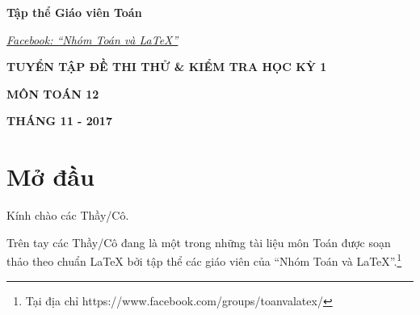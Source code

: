 \documentclass[12pt,a4paper,oneside]{book}
\renewcommand{\baselinestretch}{1.4}
\begin{document}
	\begin{titlepage}
		\begin{tcolorbox}[width=.99\textwidth,height=.99\textheight]
			\begin{flushright}
				\fontsize{17}{0}\selectfont
				\textbf{Tập thể Giáo viên Toán}
				
				\hyperlink{https://www.facebook.com/groups/toanvalatex/}{\textit{Facebook: ``Nhóm Toán và LaTeX''}}
			\end{flushright}
			
			\vspace{4cm}
			
			\begin{flushright}
				
				\vspace{1cm}
				
				\textbf{\fontsize{30}{0}\selectfont T\fontsize{20}{0}\selectfont UYỂN TẬP ĐỀ THI THỬ \& KIỂM TRA HỌC KỲ 1}
				\vspace{1cm}
				
				\textbf{\fontsize{30}{0}\selectfont MÔN TOÁN 12}
			\end{flushright}
			\vspace{3cm}
			\begin{center}
			\end{center}
			\vspace{5cm}
			\begin{center}
				\fontsize{17}{0}\textbf{THÁNG 11 - 2017}
			\end{center}
		\end{tcolorbox}
	\end{titlepage}
	\pagestyle{empty}
	\renewcommand{\headrulewidth}{0.4pt}
	
	\renewcommand{\baselinestretch}{1.3}
	
	
	\pagestyle{fancy}
	\lhead{\empty}
	\rhead{\empty}
	\lfoot{\currfilename}
	\tableofcontents
	\chapter*{Mở đầu}
	Kính chào các Thầy/Cô.
	
	\vspace{0.6cm}
	
	\noindent Trên tay các Thầy/Cô đang là một trong những tài liệu môn Toán được soạn thảo theo chuẩn \LaTeX{} bởi tập thể các giáo viên của ``Nhóm Toán và LaTeX''.\footnote{Tại địa chỉ https://www.facebook.com/groups/toanvalatex/}
	
\end{document}
